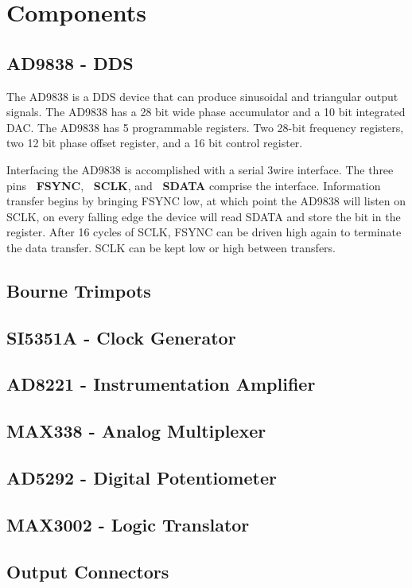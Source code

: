 \section{Components}

\subsection{AD9838 - DDS}
\label{sec:components_subs:AD9838}

The AD9838 is a DDS device that can produce sinusoidal and triangular output signals. The AD9838 has a 28 bit wide phase accumulator and a 10 bit integrated DAC. The AD9838 has 5 programmable registers. Two 28-bit frequency registers, two 12 bit phase offset register, and a 16 bit control register. 

Interfacing the AD9838 is accomplished with a serial 3wire interface. The three pins {\bf~FSYNC}, {\bf~SCLK}, and {\bf~SDATA} comprise the interface. Information transfer begins by bringing FSYNC low, at which point the AD9838 will listen on SCLK, on every falling edge the device will read SDATA and store the bit in the register. After 16 cycles of SCLK, FSYNC can be driven high again to terminate the data transfer. SCLK can be kept low or high between transfers. 




\subsection{Bourne Trimpots}
\label{sec:components_subs:trimpot}

\subsection{SI5351A - Clock Generator}
\label{sec:components_subs:si5351a}

\subsection{AD8221 - Instrumentation Amplifier}
\label{sec:components_subs:ad8221}

\subsection{MAX338 - Analog Multiplexer}
\label{sec:components_subs:max338}

\subsection{AD5292 - Digital Potentiometer}
\label{sec:components_subs:ad5292}

\subsection{MAX3002 - Logic Translator}
\label{sec:components_subs:max3002}

\subsection{Output Connectors}
\label{sec:components_subs:max3002}

